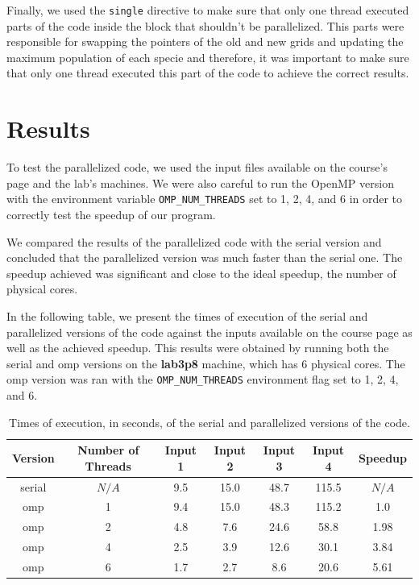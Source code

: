 \documentclass{article}
\begin{document}
Finally, we used the \texttt{single} directive to make sure that only one thread 
executed parts of the code inside the block that shouldn't be parallelized. This 
parts were responsible for swapping the pointers of the old and new grids and updating 
the maximum population of each specie and therefore, it was important to make sure that only 
one thread executed this part of the code to achieve the correct results.

\section{Results}

To test the parallelized code, we used the input files available on the course's page 
and the lab's machines. We were also careful to run the OpenMP version with the 
environment variable \texttt{OMP\_NUM\_THREADS} set to 1, 2, 4, and 6 in order to correctly 
test the speedup of our program. 

We compared the results of the parallelized code with the serial version and 
concluded that the parallelized version was much faster than the serial one. 
The speedup achieved was significant and close to the ideal speedup, the number of 
physical cores.

In the following table, we present the times of execution of the serial and parallelized 
versions of the code against the inputs available on the course page as well as the achieved 
speedup. This results were obtained by running both the serial and omp versions on the 
\textbf{lab3p8} machine, which has 6 physical cores. The omp version was ran with the 
\texttt{OMP\_NUM\_THREADS} environment flag set to 1, 2, 4, and 6.

\begin{table}[h!]
	\centering
	\begin{tabular}{||c c c c c c c||} 
	 \hline
	 Version & Number of Threads & Input 1 & Input 2 & Input 3 & Input 4 & Speedup\\ [0.5ex] 
	 \hline\hline
	 serial & $N/A$ & 9.5 & 15.0 & 48.7 & 115.5 & $N/A$ \\ 
	 omp & 1 & 9.4 & 15.0 & 48.3 & 115.2 & 1.0 \\ 
	 omp & 2 & 4.8 & 7.6 & 24.6 & 58.8 & 1.98 \\
	 omp & 4 & 2.5 & 3.9 & 12.6 & 30.1 & 3.84 \\
	 omp & 6 & 1.7 & 2.7 & 8.6 & 20.6 & 5.61 \\ [1ex] 
	 \hline
	\end{tabular}
	\caption{Times of execution, in seconds, of the serial and parallelized versions of the code.}
	\label{table:1}
\end{table}
\end{document}
